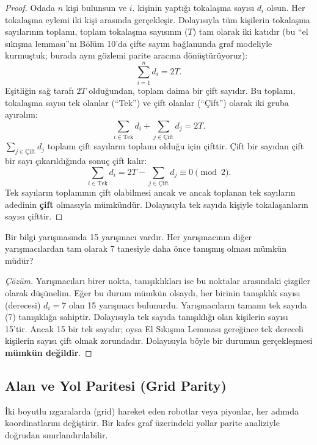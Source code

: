 \begin{proof}
Odada $n$ kişi bulunsun ve $i$. kişinin yaptığı tokalaşma sayısı $d_i$ olsun. Her tokalaşma eylemi iki kişi arasında gerçekleşir. Dolayısıyla tüm kişilerin tokalaşma sayılarının toplamı, toplam tokalaşma sayısının ($T$) tam olarak iki katıdır (bu ``el sıkışma lemması''nı Bölüm 10'da çifte sayım bağlamında graf modeliyle kurmuştuk; burada aynı gözlemi parite aracına dönüştürüyoruz):
\[
\sum_{i=1}^n d_i = 2T.
\]
Eşitliğin sağ tarafı $2T$ olduğundan, toplam daima bir çift sayıdır. Bu toplamı, tokalaşma sayısı tek olanlar (``Tek'') ve çift olanlar (``Çift'') olarak iki gruba ayıralım:
\[
\sum_{i \in \text{Tek}} d_i + \sum_{j \in \text{Çift}} d_j = 2T.
\]
$\sum_{j \in \text{Çift}} d_j$ toplamı çift sayıların toplamı olduğu için çifttir. Çift bir sayıdan çift bir sayı çıkarıldığında sonuç çift kalır:
\[
\sum_{i \in \text{Tek}} d_i = 2T - \sum_{j \in \text{Çift}} d_j \equiv 0 \pmod 2.
\]
Tek sayıların toplamının çift olabilmesi ancak ve ancak toplanan tek sayıların adedinin \textbf{çift} olmasıyla mümkündür. Dolayısıyla tek sayıda kişiyle tokalaşanların sayısı çifttir.
\end{proof}

\begin{example}
Bir bilgi yarışmasında 15 yarışmacı vardır. Her yarışmacının diğer yarışmacılardan tam olarak 7 tanesiyle daha önce tanışmış olması mümkün müdür?
\end{example}

\begin{proof}[Çözüm]
Yarışmacıları birer nokta, tanışıklıkları ise bu noktalar arasındaki çizgiler olarak düşünelim. Eğer bu durum mümkün olsaydı, her birinin tanışıklık sayısı (derecesi) $d_i = 7$ olan 15 yarışmacı bulunurdu.
Yarışmacıların tamamı tek sayıda (7) tanışıklığa sahiptir. Dolayısıyla tek sayıda tanışıklığı olan kişilerin sayısı 15'tir. Ancak 15 bir tek sayıdır; oysa El Sıkışma Lemması gereğince tek dereceli kişilerin sayısı çift olmak zorundadır. Dolayısıyla böyle bir durumun gerçekleşmesi \textbf{mümkün değildir}.
\end{proof}

\subsection{Alan ve Yol Paritesi (Grid Parity)}

İki boyutlu ızgaralarda (grid) hareket eden robotlar veya piyonlar, her adımda koordinatlarını değiştirir. Bir kafes graf üzerindeki yollar parite analiziyle doğrudan sınırlandırılabilir.

